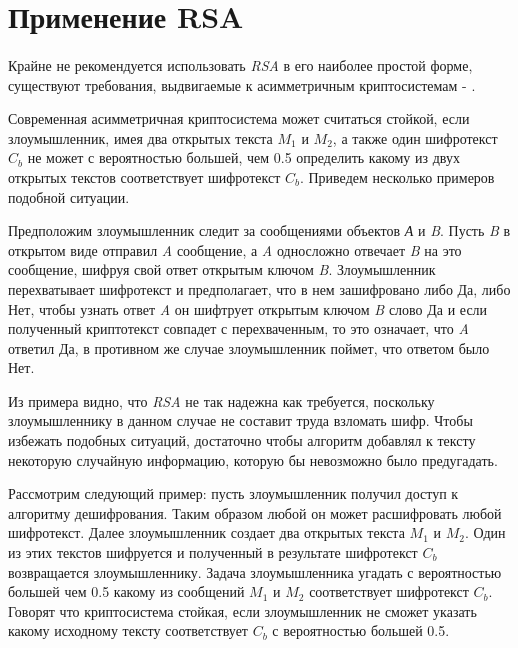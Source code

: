 
\section{Применение RSA}

\paragraph{} Крайне не рекомендуется использовать \textit{RSA} в его наиболее простой форме, существуют требования, выдвигаемые к асимметричным криптосистемам
- \cite[страницы 329-331]{may10}.

  Современная асимметричная криптосистема может считаться стойкой, если злоумышленник, имея два открытых текста {$M_1$} и 
  {$M_2$}, а также один шифротекст {$C_b$} не может с вероятностью большей, чем 0.5 определить какому из двух 
  открытых текстов соответствует шифротекст {$C_b$}. Приведем несколько примеров подобной ситуации.

  Предположим злоумышленник следит за сообщениями объектов \textit{А} и \textit{B}. Пусть 
  \textit{B} в открытом виде отправил \textit{A} сообщение, а \textit{A} односложно отвечает \textit{B} на это сообщение, шифруя свой ответ открытым ключом
  \textit{B}. Злоумышленник перехватывает шифротекст и предполагает, что в нем зашифровано либо Да, либо Нет, чтобы узнать ответ \textit{A} он шифтрует открытым ключом \textit{B} слово Да и если полученный криптотекст совпадет 
  с перехваченным, то это означает, что \textit{A} ответил Да, в противном же случае злоумышленник поймет, что ответом было Нет.

  Из примера видно, что \textit{RSA} не так надежна как требуется, поскольку злоумышленнику в данном случае не составит труда взломать шифр. Чтобы избежать подобных ситуаций, достаточно чтобы алгоритм добавлял к тексту некоторую случайную информацию, которую бы невозможно было предугадать. 

  Рассмотрим следующий пример: пусть злоумышленник получил доступ к алгоритму дешифрования. Таким образом любой он может расшифровать любой шифротекст. Далее злоумышленник создает два открытых текста {$M_1$} и {$M_2$}. 
  Один из этих текстов шифруется и полученный в результате шифротекст {$C_b$} возвращается злоумышленнику. Задача злоумышленника 
  угадать с вероятностью большей чем 0.5 какому из сообщений {$M_1$} и {$M_2$} соответствует шифротекст {$C_b$}. Говорят что криптосистема стойкая, если злоумышленник не сможет указать какому исходному тексту соответствует {$C_b$} с вероятностью большей 0.5.

